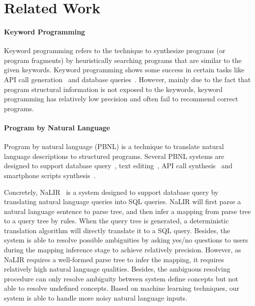 \section{Related Work}

\paragraph{Keyword Programming} Keyword programming refers to the technique to synthesize programs (or program fragments) by heuristically searching programs that are similar to the given keywords. Keyword programming shows some success in certain tasks like API call generation~\cite{DBLP:journals/ase/LittleM09, DBLP:conf/pldi/MandelinXBK05} and database queries~\cite{DBLP:conf/icde/AgrawalCD02, DBLP:conf/icde/BhalotiaHNCS02}. However, mainly due to the fact that program structural information is not exposed to the keywords, keyword programming has relatively low precision and often fail to recommend correct programs.

\paragraph{Program by Natural Language} Program by natural language (PBNL) is a technique to translate natural language descriptions to structured programs. Several PBNL systems are designed to support database query~\cite{DBLP:conf/sigmod/GulwaniM14, DBLP:journals/tods/LiYJ07, DBLP:journals/pvldb/LiJ14}, text editing~\cite{DBLP:journals/corr/DesaiGHJKMRR15}, API call synthesis~\cite{DBLP:journals/corr/RaghothamanWH15} and smartphone scripts synthesis~\cite{DBLP:conf/mobisys/LeGS13}.

Concretely, NaLIR~\cite{DBLP:journals/pvldb/LiJ14} is a system designed to support database query by translating natural language queries into SQL queries. NaLIR will first parse a natural language sentence to parse tree, and then infer a mapping from parse tree to a query tree by rules. When the query tree is generated, a deterministic translation algorithm will directly translate it to a SQL query. Besides, the system is able to resolve possible ambiguities by asking yes/no questions to users during the mapping inference stage to achieve relatively precision. However, as NaLIR requires a well-formed parse tree to infer the mapping, it requires relatively high natural language qualities. Besides, the ambiguous resolving procedure can only resolve ambiguity between system define concepts but not able to resolve undefined concepts. Based on machine learning techniques, our system is able to handle more noisy natural language inputs.


